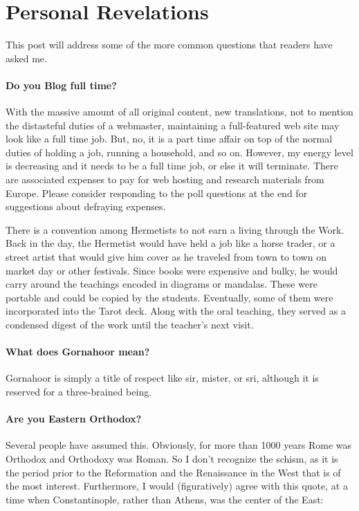 \section{Personal Revelations}

This post will address some of the more common questions that readers have asked me.

\paragraph{Do you Blog full time?}


With the massive amount of all original content, new translations, not to mention the distasteful duties of a webmaster, maintaining a full-featured web site may look like a full time job. But, no, it is a part time affair on top of the normal duties of holding a job, running a household, and so on. However, my energy level is decreasing and it needs to be a full time job, or else it will terminate. There are associated expenses to pay for web hosting and research materials from Europe. Please consider responding to the poll questions at the end for suggestions about defraying expenses.

There is a convention among Hermetists to not earn a living through the Work. Back in the day, the Hermetist would have held a job like a horse trader, or a street artist that would give him cover as he traveled from town to town on market day or other festivals. Since books were expensive and bulky, he would carry around the teachings encoded in diagrams or mandalas. These were portable and could be copied by the students. Eventually, some of them were incorporated into the Tarot deck. Along with the oral teaching, they served as a condensed digest of the work until the teacher's next visit.

\paragraph{What does Gornahoor mean?}


Gornahoor is simply a title of respect like sir, mister, or sri, although it is reserved for a three-brained being.

\paragraph{Are you Eastern Orthodox?}


Several people have assumed this. Obviously, for more than 1000 years Rome was Orthodox and Orthodoxy was Roman. So I don't recognize the schism, as it is the period prior to the Reformation and the Renaissance in the West that is of the most interest. Furthermore, I would (figuratively) agree with this quote, at a time when Constantinople, rather than Athens, was the center of the East:

